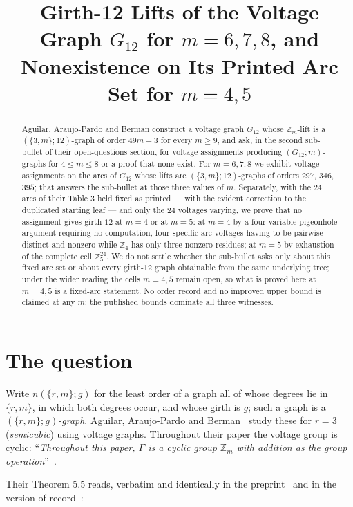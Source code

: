\documentclass[11pt]{amsart}
\title[Girth-12 lifts of $G_{12}$ for $m = 6,7,8$]
{Girth-12 Lifts of the Voltage Graph $G_{12}$ for $m = 6, 7, 8$,
 and Nonexistence on Its Printed Arc Set for $m = 4, 5$}
\date{}
\theoremstyle{remark}
\newcommand{\Zm}{\mathbb{Z}_m}
\newcommand{\Gt}{G_{12}}
\begin{document}
\begin{abstract}
Aguilar, Araujo-Pardo and Berman construct a voltage graph $\Gt$ whose
$\Zm$-lift is a $(\{3,m\};12)$-graph of order $49m+3$ for every $m \ge 9$, and
ask, in the second sub-bullet of their open-questions section, for voltage
assignments producing $(\Gt;m)$-graphs for $4 \le m \le 8$ or a proof that none
exist. For $m = 6, 7, 8$ we exhibit voltage assignments on the arcs of $\Gt$
whose lifts are $(\{3,m\};12)$-graphs of orders $297$, $346$, $395$; that
answers the sub-bullet at those three values of $m$. Separately, with the $24$
arcs of their Table 3 held fixed as printed --- with the evident correction to
the duplicated starting leaf --- and only the $24$ voltages varying, we prove
that no assignment gives girth $12$ at $m = 4$ or at $m = 5$: at $m = 4$ by a
four-variable pigeonhole argument requiring no computation, four specific arc
voltages having to be pairwise distinct and nonzero while $\mathbb{Z}_4$ has
only three nonzero residues; at $m = 5$ by exhaustion of the complete cell
$\mathbb{Z}_5^{24}$. We do not settle whether the sub-bullet asks only about
this fixed arc set or about every girth-$12$ graph obtainable from the same
underlying tree; under the wider reading the cells $m = 4, 5$ remain open, so
what is proved here at $m = 4, 5$ is a fixed-arc statement. No order record and
no improved upper bound is claimed at any $m$: the published bounds dominate all
three witnesses.
\end{abstract}

\maketitle

\section{The question}\label{sec:q}

Write $n(\{r,m\};g)$ for the least order of a graph all of whose degrees lie in
$\{r,m\}$, in which both degrees occur, and whose girth is $g$; such a graph is
a \emph{$(\{r,m\};g)$-graph}. Aguilar, Araujo-Pardo and
Berman~\cite{AAB} study these for $r=3$ (\emph{semicubic}) using voltage
graphs. Throughout their paper the voltage group is cyclic: ``\emph{Throughout
this paper, $\Gamma$ is a cyclic group $\mathbb{Z}_m$ with addition as the group
operation}''~\cite{AABarxiv}.

Their Theorem 5.5 reads, verbatim and identically in the
preprint~\cite{AABarxiv} and in the version of record~\cite[p.~25]{AAB}:
\end{document}
